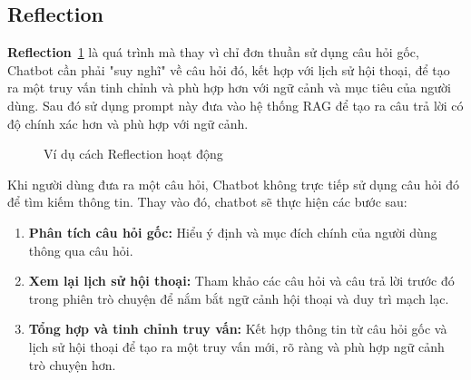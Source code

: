 \documentclass{article}
\numberwithin{equation}{section}
\numberwithin{equation}{section}
\begin{document}
\subsection{Reflection}
\textbf{Reflection}~\ref{fig:reflection} là quá trình mà thay vì chỉ đơn thuần sử dụng câu hỏi gốc, Chatbot cần phải "suy nghĩ" về câu hỏi đó, kết hợp với lịch sử hội thoại, để tạo ra một truy vấn tinh chỉnh và phù hợp hơn với ngữ cảnh và mục tiêu của người dùng. Sau đó sử dụng prompt này đưa vào hệ thống RAG để tạo ra câu trả lời có độ chính xác hơn và phù hợp với ngữ cảnh.

\begin{figure}[!ht]
    \centering
    \caption{Ví dụ cách Reflection hoạt động}
    \label{fig:reflection}
\end{figure}

Khi người dùng đưa ra một câu hỏi, Chatbot không trực tiếp sử dụng câu hỏi đó để tìm kiếm thông tin. Thay vào đó, chatbot sẽ thực hiện các bước sau:

\begin{enumerate}
\item \textbf{Phân tích câu hỏi gốc:} Hiểu ý định và mục đích chính của người dùng thông qua câu hỏi.
\item \textbf{Xem lại lịch sử hội thoại:} Tham khảo các câu hỏi và câu trả lời trước đó trong phiên trò chuyện để nắm bắt ngữ cảnh hội thoại và duy trì mạch lạc.
\item \textbf{Tổng hợp và tinh chỉnh truy vấn:} Kết hợp thông tin từ câu hỏi gốc và lịch sử hội thoại để tạo ra một truy vấn mới, rõ ràng và phù hợp ngữ cảnh trò chuyện hơn.
\end{enumerate}
\end{document}
